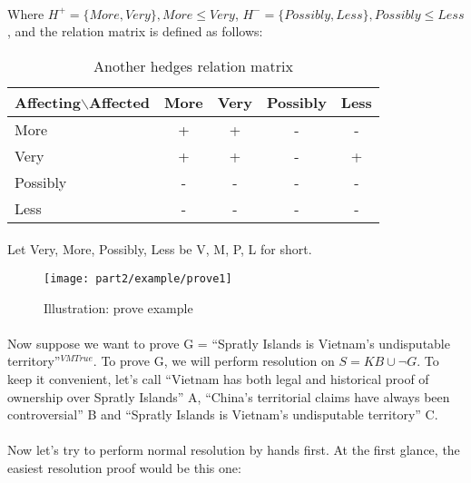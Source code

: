 \documentclass[../gr-final.tex]{subfiles}
\begin{document}
\paragraph{} Where $H^{+} =
\{More, Very\}, More \le Very$, $H^{-} = \{Possibly, Less\},
Possibly \le Less$, and the relation matrix is defined as follows:
\begin{table}[H]
  \centering
\begin{tabular}{|l|c|c|c|c|}
\hline
            Affecting$\backslash$Affected & More & Very & Possibly & Less \\ \hline
            More                        & +    & +    & -    & -    \\ \hline
            Very                        & +    & +    & -    & +    \\ \hline
            Possibly                    & -    & -    & -    & -    \\ \hline
            Less                        & -    & -    & -    & -    \\ \hline
\end{tabular}
\caption {Another hedges relation matrix}
\end{table}
\paragraph{} Let Very, More, Possibly, Less be V, M, P, L for
short.


\begin{figure}[H]
  \centering
  \texttt{[image: part2/example/prove1]}
  \caption{Illustration: prove example}
\end{figure}
\paragraph{} Now suppose we want to prove G = 
``Spratly Islands is Vietnam's undisputable
territory''$^{VMTrue}$. To prove G, we will
perform resolution on $S = KB \cup \neg{G}$. 
To keep it convenient, let's call ``Vietnam has both legal and
historical proof of ownership over Spratly Islands'' A, ``China's
territorial claims have always been controversial'' B and
``Spratly Islands is Vietnam's undisputable territory'' C.

\paragraph{} Now let's try to perform normal resolution by hands
first. At the first glance, the easiest resolution proof
would be this one:
\end{document}
